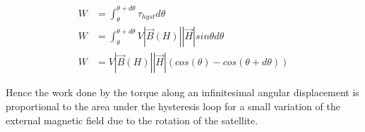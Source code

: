 \begin{align}
	W &= \int_{\theta}^{\theta + d\theta}\tau_{hyst}d\theta \\
	W &= \int_{\theta}^{\theta + d\theta} V|\vec{B}(H) | |\vec{H}|sin \theta d\theta \\
	W &= V|\vec{B}(H) | |\vec{H}|(cos(\theta) - cos(\theta + d\theta))
\end{align}

\indent
	Hence the work done by the torque along an infinitesimal angular displacement is proportional to the area under the hysteresis loop for a small variation of the external magnetic field due to the rotation of the satellite.